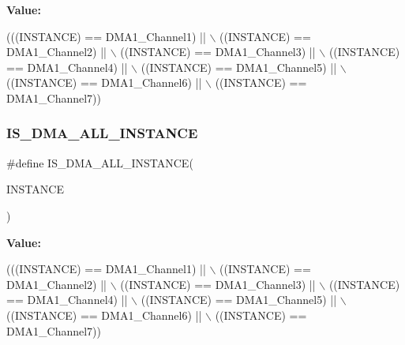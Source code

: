 {\bfseries Value\+:}
\begin{DoxyCode}
(((INSTANCE) == DMA1\_Channel1) || \(\backslash\)
                                       ((INSTANCE) == DMA1\_Channel2) || \(\backslash\)
                                       ((INSTANCE) == DMA1\_Channel3) || \(\backslash\)
                                       ((INSTANCE) == DMA1\_Channel4) || \(\backslash\)
                                       ((INSTANCE) == DMA1\_Channel5) || \(\backslash\)
                                       ((INSTANCE) == DMA1\_Channel6) || \(\backslash\)
                                       ((INSTANCE) == DMA1\_Channel7))
\end{DoxyCode}
\mbox{\label{group___exported__macro_ga40beb02b397c5f47e22a83fc28034afe}} 
\subsubsection{\texorpdfstring{I\+S\+\_\+\+D\+M\+A\+\_\+\+A\+L\+L\+\_\+\+I\+N\+S\+T\+A\+N\+CE}{IS\_DMA\_ALL\_INSTANCE}\hspace{0.1cm}{\footnotesize\ttfamily [14/16]}}
{\footnotesize\ttfamily \#define I\+S\+\_\+\+D\+M\+A\+\_\+\+A\+L\+L\+\_\+\+I\+N\+S\+T\+A\+N\+CE(\begin{DoxyParamCaption}\item[{}]{I\+N\+S\+T\+A\+N\+CE }\end{DoxyParamCaption})}

{\bfseries Value\+:}
\begin{DoxyCode}
(((INSTANCE) == DMA1\_Channel1) || \(\backslash\)
                                       ((INSTANCE) == DMA1\_Channel2) || \(\backslash\)
                                       ((INSTANCE) == DMA1\_Channel3) || \(\backslash\)
                                       ((INSTANCE) == DMA1\_Channel4) || \(\backslash\)
                                       ((INSTANCE) == DMA1\_Channel5) || \(\backslash\)
                                       ((INSTANCE) == DMA1\_Channel6) || \(\backslash\)
                                       ((INSTANCE) == DMA1\_Channel7))
\end{DoxyCode}
\mbox{\label{group___exported__macro_ga40beb02b397c5f47e22a83fc28034afe}} 
